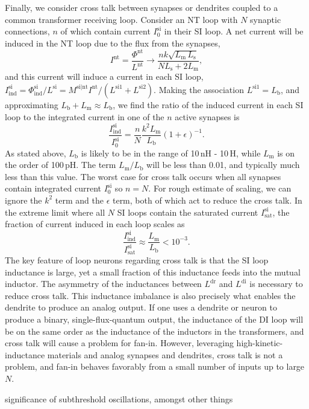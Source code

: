\documentclass[twocolumn]{article}
\begin{document}
Finally, we consider cross talk between synapses or dendrites coupled to a common transformer receiving loop. Consider an NT loop with $N$ synaptic connections, $n$ of which contain current $I^{\mathrm{si}}_0$ in their SI loop. A net current will be induced in the NT loop due to the flux from the synapses,
\begin{equation}
\label{eq:fan-in__transformer_collection__I_nt}
I^{\mathrm{nt}} = \frac{\Phi^{\mathrm{nt}}}{L^{\mathrm{nt}}}\rightarrow \frac{ n k \sqrt{L_{\mathrm{m}}\,L_{\mathrm{s}}}}{NL_{\mathrm{s}}+2L_{\mathrm{m}}},
\end{equation}
and this current will induce a current in each SI loop, $I^{\mathrm{si}}_{\mathrm{ind}} = \Phi^{\mathrm{si}}_{\mathrm{ind}}/L^{\mathrm{si}} = M^{\mathrm{si|nt}}I^{\mathrm{nt}}/(L^{\mathrm{si1}}+L^{\mathrm{si2}})$. Making the association $L^{\mathrm{si1}} = L_{\mathrm{b}}$, and approximating $L_{\mathrm{b}} + L_{\mathrm{m}} \approx L_{\mathrm{b}}$, we find the ratio of the induced current in each SI loop to the integrated current in one of the $n$ active synapses is
\begin{equation}
\label{eq:fan-in__transformer_collection__cross_talk}
\frac{I^{\mathrm{si}}_{\mathrm{ind}}}{I^{\mathrm{si}}_0} = \frac{n}{N}\frac{k^2L_{\mathrm{m}}}{L_{\mathrm{b}}}\left( 1+\epsilon \right)^{-1}.
\end{equation}
As stated above, $L_{\mathrm{b}}$ is likely to be in the range of 10\,nH - 10\,\textmu H, while $L_{\mathrm{m}}$ is on the order of 100\,pH. The term $L_{\mathrm{m}}/L_{\mathrm{b}}$ will be less than 0.01, and typically much less than this value. The worst case for cross talk occurs when all synapses contain integrated current $I^{\mathrm{si}}_0$ so $n = N$. For rough estimate of scaling, we can ignore the $k^2$ term and the $\epsilon$ term, both of which act to reduce the cross talk. In the extreme limit where all $N$ SI loops contain the saturated current $I^{\mathrm{si}}_{\mathrm{sat}}$, the fraction of current induced in each loop scales as
\begin{equation}
\label{eq:fan-in__transformer_collection__cross_talk__worst_case}
\frac{I^{\mathrm{si}}_{\mathrm{ind}}}{I^{\mathrm{si}}_{\mathrm{sat}}} \approx \frac{L_{\mathrm{m}}}{L_{\mathrm{b}}} < 10^{-3}.
\end{equation}
The key feature of loop neurons regarding cross talk is that the SI loop inductance is large, yet a small fraction of this inductance feeds into the mutual inductor. The asymmetry of the inductances between $L^{\mathrm{dr}}$ and $L^{\mathrm{di}}$ is necessary to reduce cross talk. This inductance imbalance is also precisely what enables the dendrite to produce an analog output. If one uses a dendrite or neuron to produce a binary, single-flux-quantum output, the inductance of the DI loop will be on the same order as the inductance of the inductors in the transformers, and cross talk will cause a problem for fan-in. However, leveraging high-kinetic-inductance materials and analog synapses and dendrites, cross talk is not a problem, and fan-in behaves favorably from a small number of inputs up to large $N$.

\vspace{3em}
significance of subthreshold oscillations, amongst other things \cite{azca2018}



\end{document}
